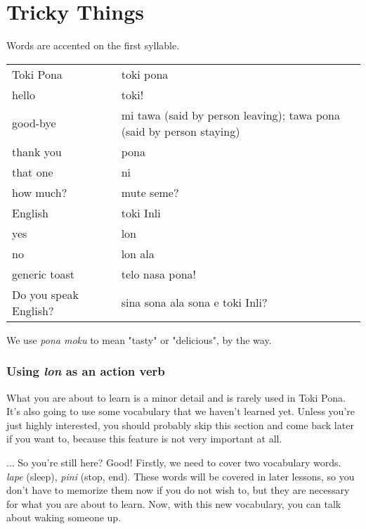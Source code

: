 \section{Tricky Things}

Words are accented on the first syllable.

\begin{supertabular}{p{5,5cm}|ll}
Toki Pona && toki pona \\ %
hello && toki! \\ %
good-bye && mi tawa (said by person leaving); tawa pona (said by person staying) \\ %
thank you && pona \\ %
that one && ni \\ %
how much? && mute seme? \\ %
English && toki Inli \\ %
yes && lon \\ %
no && lon ala \\ %
generic toast && telo nasa pona! \\ %
Do you speak English? && sina sona ala sona e toki Inli? \\ %
\end{supertabular} 





We use \textit{pona moku} to mean "tasty" or "delicious", by the way. 

\subsubsection*{Using \textit{lon} as an action verb}

What you are about to learn is a minor detail and is rarely used in Toki Pona. 
It's also going to use some vocabulary that we haven't learned yet. 
Unless you're just highly interested, you should probably skip this section and come back later if you want to, because this feature is not very important at all. 

... So you're still here? Good! 
Firstly, we need to cover two vocabulary words. 
\textit{lape} (sleep), \textit{pini} (stop, end). 
These words will be covered in later lessons, so you don't have to memorize them now if you do not wish to, but they are necessary for what you are about to learn. 
Now, with this new vocabulary, you can talk about waking someone up.

